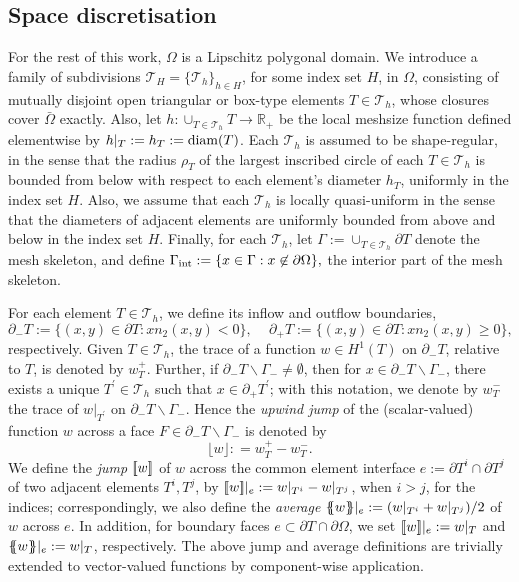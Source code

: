 \documentclass{amsart}
\newcommand{\jump}[1]{[\kern-0.6mm [{#1}]\kern-0.6mm]}
\newcommand{\av}[1]{\{\kern-1.2mm \{{#1}\}\kern-1.2mm\}}
\newcommand{\Th}{\mathcal{T}_h}
\newcommand{\gint}{\Gamma_{\rm int}}
\newcommand{\gif}{\Gamma_-}
\newcommand{\jumpu}[1]{ \lfloor #1 \rfloor }
\theoremstyle{definition}
\theoremstyle{remark}
\numberwithin{equation}{section}
\begin{document}
\subsection{Space discretisation}
For the rest of this work, $\Omega$ is a Lipschitz polygonal domain. We introduce a family of subdivisions $\mathcal{T}_H=\{\Th\}_{h\in H}$, for some index set $H$,  in $\Omega$, consisting of mutually disjoint open triangular or box-type elements $T\in \Th $, whose closures cover $\bar{\Omega}$ exactly.
Also, let $h\colon\cup_{T\in\Th } T\to\mathbb{R}_+$ be the local meshsize function defined elementwise by $h|_T:=h_T:={\rm diam}(T)$.
Each $\Th $ is assumed to be shape-regular, in the sense that the radius $\rho_T$ of the largest inscribed circle of each $T\in\Th $ is bounded from below with respect to each element's diameter $h_T$, uniformly in the index set $H$.
Also, we assume that each $\Th $ is locally quasi-uniform in the sense that the diameters of adjacent elements are uniformly bounded from above and below in the index set $H$. Finally, for each $\Th $, let $\Gamma:=\cup_{T\in\Th }\partial T$ denote the mesh skeleton, and define
$
    \gint : = \{x \in \Gamma : x \not \in \partial \Omega\},
$
the interior part of the mesh skeleton.



For each element  $T\in \Th $, we define its inflow and outflow boundaries,
\[
\partial_- T := \{ (x,y) \in \partial T :  x  n_2(x,y) <0 \} \mbox{, }\quad  \partial_+ T := \{ (x,y) \in \partial T :  x n_2(x,y)  \geq 0 \},
\]
respectively.
Given $T\in \Th $, the trace of a function $w \in H^1(T)$ on $\partial_- T$, relative to $T$, is denoted by $w_{T}^+$. Further, if $\partial_- T \backslash    \gif \neq \emptyset$, then for $x\in \partial_- T\backslash    \gif$, there exists a unique $T^\prime \in \Th $ such that $x\in \partial_+ T^{\prime}$; with this notation, we denote by $w_{T}^-$ the trace of $w|_{T^\prime}$ on $\partial_- T \backslash \gif$. Hence the \emph{upwind jump} of the (scalar-valued) function $w$ across a face $F\in \partial_{-}T \backslash \gif$ is denoted by
$$
\jumpu{w}: = w^+_T - w^-_T.
$$
We define the \emph{jump} $\jump{w}$ of $w$ across the common element interface $e:=\partial T^i\cap \partial T^j$ of two adjacent elements $T^i,T^j$, by $\jump{w}|_e:=w|_{T^i}-w|_{T^j}$, when $i>j$, for the indices; correspondingly, we also define the \emph{average} $\av{w}|_e:=(w|_{T^i}+w|_{T^j})/2$ of $w$ across $e$.
In addition, for boundary faces $e\subset \partial T\cap \partial\Omega$, we set $\jump{w}|_e:=w|_{T}$ and $\av{w}|_e:=w|_{T}$, respectively. The above jump and average definitions are trivially extended to vector-valued functions by component-wise application.
\end{document}
